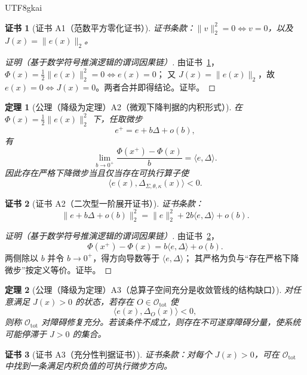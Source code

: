 \documentclass[12pt]{article}
\newtheorem{theorem}{定理}[section]
\newtheorem{Certificate}{证书}[section]
\begin{document}
\begin{CJK*}{UTF8}{gkai}
\begin{Certificate}[证书 A1（范数平方零化证书）]
\label{cert:tex28-ch15-a1}
证书条款：$\|v\|_2^2=0\iff v=0$，以及 $J(x)=\|e(x)\|_2$。
\end{Certificate}

\begin{proof}[证明（基于数学符号推演逻辑的谓词因果链）]
由证书~\ref{cert:tex28-ch15-a1}，$\Phi(x)=\tfrac12\|e(x)\|_2^2=0\iff e(x)=0$；
又 $J(x)=\|e(x)\|_2$，故 $e(x)=0\iff J(x)=0$。两者合并即得结论。证毕。
\end{proof}

\begin{theorem}[公理（降级为定理）A2（微观下降判据的内积形式）]
\label{thm:tex28-ch15-a2}
在 $\Phi(x)=\frac12\|e(x)\|_2^2$ 下，任取微步
\[
  e^+=e+b\Delta+o(b),
\]
有
\[
  \lim_{b\to 0^+}\frac{\Phi(x^+)-\Phi(x)}{b}
  =
  \langle e,\Delta\rangle.
\]
因此存在严格下降微步当且仅当存在可执行算子使
\[
  \langle e(x),\Delta_{\Sigma,\theta,\kappa}(x)\rangle<0.
\]
\end{theorem}

\begin{Certificate}[证书 A2（二次型一阶展开证书）]
\label{cert:tex28-ch15-a2}
证书条款：
\[
  \|e+b\Delta+o(b)\|_2^2
  =
  \|e\|_2^2+2b\langle e,\Delta\rangle+o(b).
\]
\end{Certificate}

\begin{proof}[证明（基于数学符号推演逻辑的谓词因果链）]
由证书~\ref{cert:tex28-ch15-a2}，
\[
  \Phi(x^+)-\Phi(x)
  =
  b\langle e,\Delta\rangle+o(b).
\]
两侧除以 $b$ 并令 $b\to0^+$，得方向导数等于 $\langle e,\Delta\rangle$；
其严格为负与“存在严格下降微步”按定义等价。证毕。
\end{proof}

\begin{theorem}[公理（降级为定理）A3（总算子空间充分是收敛管线的结构缺口）]
\label{thm:tex28-ch15-a3}
对任意满足 $J(x)>0$ 的状态，若存在 $O\in\mathcal O_{\mathrm{tot}}$ 使
\[
  \langle e(x),\Delta_O(x)\rangle<0,
\]
则称 $\mathcal O_{\mathrm{tot}}$ 对障碍修复充分。若该条件不成立，则存在不可遂穿障碍分量，使系统可能停滞于 $J>0$ 的集合。
\end{theorem}

\begin{Certificate}[证书 A3（充分性判据证书）]
\label{cert:tex28-ch15-a3}
证书条款：对每个 $J(x)>0$，可在 $\mathcal O_{\mathrm{tot}}$ 中找到一条满足内积负值的可执行微步方向。
\end{Certificate}


\end{CJK*}
\end{document}
